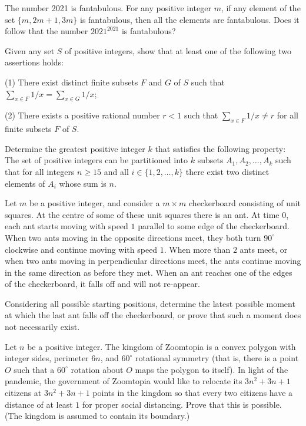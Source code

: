 \documentclass[11pt]{scrartcl}
\begin{document}
\begin{problem}[166169225490521]
	The number 2021 is fantabulous. For any positive integer $m$, if any element of the set $\{m, 2m+1, 3m\}$ is fantabulous, then all the elements are fantabulous. Does it follow that the number $2021^{2021}$ is fantabulous?
\end{problem}
\begin{problem}[120381541018683]
Given any set $S$ of positive integers, show that at least one of the following two assertions holds:

(1) There exist distinct finite subsets $F$ and $G$ of $S$ such that $\sum_{x\in F}1/x=\sum_{x\in G}1/x$;

(2) There exists a positive rational number $r<1$ such that $\sum_{x\in F}1/x\neq r$ for all finite subsets $F$ of $S$.
\end{problem}
\begin{problem}[7796424663887996427]
Determine the greatest positive integer $k$ that satisfies the following property: The set of positive integers can be partitioned into $k$ subsets $A_1, A_2, \ldots, A_k$ such that for all integers $n \geq 15$ and all $i \in \{1, 2, \ldots, k\}$ there exist two distinct elements of $A_i$ whose sum is $n.$
\end{problem}
\begin{problem}[2358076615453535648]
Let $m$ be a positive integer, and consider a $m\times m$ checkerboard consisting of unit squares. At the centre of some of these unit squares there is an ant. At time $0$, each ant starts moving with speed $1$ parallel to some edge of the checkerboard. When two ants moving in the opposite directions meet, they both turn $90^{\circ}$ clockwise and continue moving with speed $1$. When more than $2$ ants meet, or when two ants moving in perpendicular directions meet, the ants continue moving in the same direction as before they met. When an ant reaches one of the edges of the checkerboard, it falls off and will not re-appear.

Considering all possible starting positions, determine the latest possible moment at which the last ant falls off the checkerboard, or prove that such a moment does not necessarily exist.
\end{problem}
\begin{problem}[9085006630991620229]
Let \(n\) be a positive integer. The kingdom of Zoomtopia is a convex polygon with integer sides, perimeter \(6n\), and \(60^\circ\) rotational symmetry (that is, there is a point \(O\) such that a \(60^\circ\) rotation about \(O\) maps the polygon to itself). In light of the pandemic, the government of Zoomtopia would like to relocate its \(3n^2+3n+1\) citizens at \(3n^2+3n+1\) points in the kingdom so that every two citizens have a distance of at least \(1\) for proper social distancing. Prove that this is possible. (The kingdom is assumed to contain its boundary.)
\end{problem}
\end{document}
